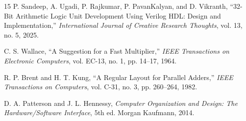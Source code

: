 \documentclass[conference]{IEEEtran}
\begin{document}
\begin{thebibliography}{15}
P. Sandeep, A. Ugadi, P. Rajkumar, P. PavanKalyan, and D. Vikranth, ``32-Bit Arithmetic Logic Unit Development Using Verilog HDL: Design and Implementation,'' \emph{International Journal of Creative Research Thoughts}, vol. 13, no. 5, 2025. 

C. S. Wallace, ``A Suggestion for a Fast Multiplier,'' \emph{IEEE Transactions on Electronic Computers}, vol. EC-13, no. 1, pp. 14--17, 1964.

R. P. Brent and H. T. Kung, ``A Regular Layout for Parallel Adders,'' \emph{IEEE Transactions on Computers}, vol. C-31, no. 3, pp. 260--264, 1982.

D. A. Patterson and J. L. Hennessy, \emph{Computer Organization and Design: The Hardware/Software Interface}, 5th ed. Morgan Kaufmann, 2014.

\end{thebibliography}
\end{document}
